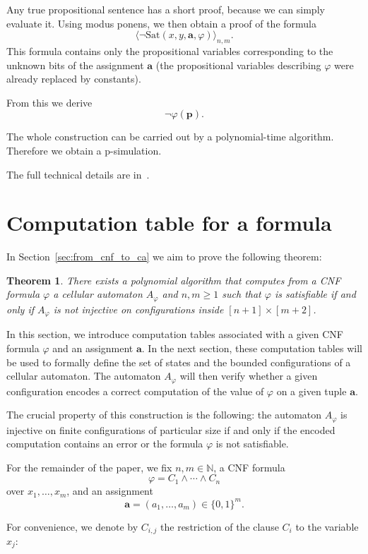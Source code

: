 \documentclass{article}
\theoremstyle{plain}
\newtheorem{theorem}{Theorem}[section]
\theoremstyle{definition}
\newcommand{\tuple}{\mathbf}
\begin{document}
Any true propositional sentence has a short proof,
because we can simply evaluate it.
Using modus ponens, we then obtain a proof of the formula
\[
\langle\neg \mathrm{Sat}(x,y,\tuple a,\varphi)\rangle_{n,m}.
\]
This formula contains only the propositional variables corresponding to the unknown bits
of the assignment $\tuple a$
(the propositional variables describing $\varphi$ were already replaced by constants).

From this we derive
\[
\neg \varphi(\tuple p).
\]

The whole construction can be carried out by a polynomial-time algorithm.
Therefore we obtain a p-simulation.

The full technical details are in~\cite[Section~8.4]{krajicek2019}.


\section{Computation table for a formula}

In Section~\ref{sec:from_cnf_to_ca} we aim to prove the following theorem:

\begin{theorem}
    There exists a polynomial algorithm that computes from a CNF formula $\varphi$ a cellular automaton $A_\varphi$ and $n, m \geq 1$ such that  $\varphi$ is satisfiable if and only if $A_\varphi$ is not injective on configurations inside $[n+1] \times [m+2]$. 
\end{theorem}

In this section, we introduce computation tables associated with a given CNF formula $\varphi$ and an assignment $\tuple a$.
In the next section, these computation tables will be used to formally define the set of states
and the bounded configurations of a cellular automaton.
The automaton $A_\varphi$ will then verify whether a given configuration encodes a
correct computation of the value of $\varphi$ on a given tuple $\tuple a$.

The crucial property of this construction is the following:
the automaton $A_\varphi$ is injective on finite configurations of particular size if and only if the encoded computation
contains an error or the formula $\varphi$ is not satisfiable.


For the remainder of the paper, we fix $n,m \in \mathbb{N}$, a CNF formula
\[
\varphi = C_1 \wedge \cdots \wedge C_n
\]
over $x_1,\dots,x_m$, and an assignment
\[
\tuple a = (a_1,\dots,a_m) \in \{0,1\}^m.
\]


For convenience, we denote by $C_{i,j}$ the restriction of the clause $C_i$ to the variable $x_j$:
\end{document}

